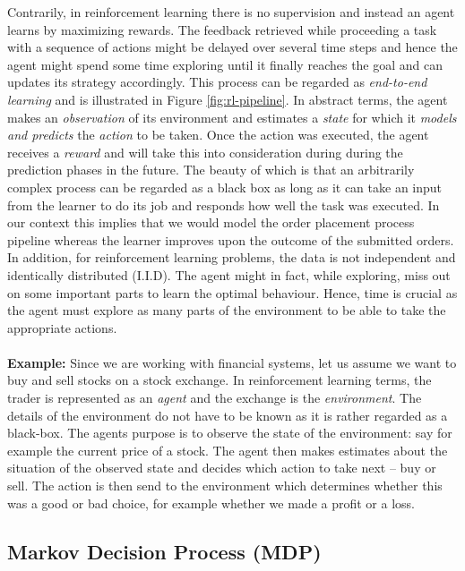 Contrarily, in reinforcement learning there is no supervision and instead an agent learns by maximizing rewards.
The feedback retrieved while proceeding a task with a sequence of actions might be delayed over several time steps and hence the agent might spend some time exploring until it finally reaches the goal and can updates its strategy accordingly.
This process can be regarded as \textit{end-to-end learning} and is illustrated in Figure \ref{fig:rl-pipeline}.
In abstract terms, the agent makes an \textit{observation} of its environment and estimates a \textit{state} for which it \textit{models and predicts} the \textit{action} to be taken.
Once the action was executed, the agent receives a \textit{reward} and will take this into consideration during during the prediction phases in the future. 
The beauty of which is that an arbitrarily complex process can be regarded as a black box as long as it can take an input from the learner to do its job and responds how well the task was executed.
In our context this implies that we would model the order placement process pipeline whereas the learner improves upon the outcome of the submitted orders.
In addition, for reinforcement learning problems, the data is not independent and identically distributed (I.I.D). 
The agent might in fact, while exploring, miss out on some important parts to learn the optimal behaviour. 
Hence, time is crucial as the agent must explore as many parts of the environment to be able to take the appropriate actions. \cite{rl-demystified}
\\
\\
\textbf{Example:} Since we are working with financial systems, let us assume we want to buy and sell stocks on a stock exchange. 
In reinforcement learning terms, the trader is represented as an \textit{agent} and the exchange is the \textit{environment}.
The details of the environment do not have to be known as it is rather regarded as a black-box.
The agents purpose is to observe the state of the environment: say for example the current price of a stock.
The agent then makes estimates about the situation of the observed state and decides which action to take next – buy or sell. 
The action is then send to the environment which determines whether this was a good or bad choice, for example whether we made a profit or a loss.

\subsection{Markov Decision Process (MDP)}
\label{rl-mdp}

